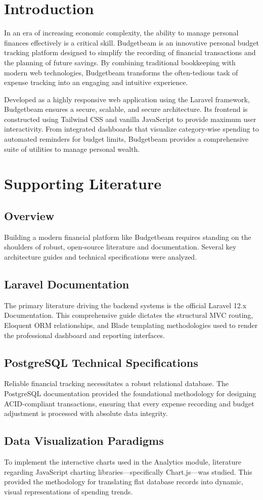\chapter{Introduction}
In an era of increasing economic complexity, the ability to manage personal finances effectively is a critical skill. Budgetbeam is an innovative personal budget tracking platform designed to simplify the recording of financial transactions and the planning of future savings. By combining traditional bookkeeping with modern web technologies, Budgetbeam transforms the often-tedious task of expense tracking into an engaging and intuitive experience.

Developed as a highly responsive web application using the Laravel framework, Budgetbeam ensures a secure, scalable, and secure architecture. Its frontend is constructed using Tailwind CSS and vanilla JavaScript to provide maximum user interactivity. From integrated dashboards that visualize category-wise spending to automated reminders for budget limits, Budgetbeam provides a comprehensive suite of utilities to manage personal wealth.

\chapter{Supporting Literature}
\section{Overview}
Building a modern financial platform like Budgetbeam requires standing on the shoulders of robust, open-source literature and documentation. Several key architecture guides and technical specifications were analyzed.

\section{Laravel Documentation}
The primary literature driving the backend systems is the official Laravel 12.x Documentation. This comprehensive guide dictates the structural MVC routing, Eloquent ORM relationships, and Blade templating methodologies used to render the professional dashboard and reporting interfaces.

\section{PostgreSQL Technical Specifications}
Reliable financial tracking necessitates a robust relational database. The PostgreSQL documentation provided the foundational methodology for designing ACID-compliant transactions, ensuring that every expense recording and budget adjustment is processed with absolute data integrity.

\section{Data Visualization Paradigms}
To implement the interactive charts used in the Analytics module, literature regarding JavaScript charting libraries—specifically Chart.js—was studied. This provided the methodology for translating flat database records into dynamic, visual representations of spending trends.
